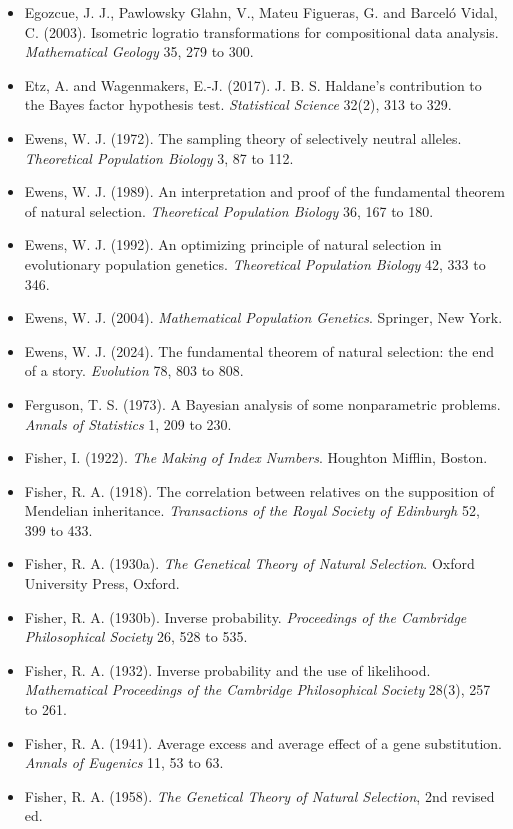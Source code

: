 \begin{itemize}
\item Egozcue, J. J., Pawlowsky Glahn, V., Mateu Figueras, G. and Barcel\'o Vidal, C. (2003).
Isometric logratio transformations for compositional data analysis. \emph{Mathematical Geology} 35,
279 to 300.
\item Etz, A. and Wagenmakers, E.-J. (2017). J. B. S. Haldane's contribution to the Bayes factor
hypothesis test. \emph{Statistical Science} 32(2), 313 to 329.
\item Ewens, W. J. (1972). The sampling theory of selectively neutral alleles.
\emph{Theoretical Population Biology} 3, 87 to 112.
\item Ewens, W. J. (1989). An interpretation and proof of the fundamental theorem of natural
selection. \emph{Theoretical Population Biology} 36, 167 to 180.
\item Ewens, W. J. (1992). An optimizing principle of natural selection in evolutionary population
genetics. \emph{Theoretical Population Biology} 42, 333 to 346.
\item Ewens, W. J. (2004). \emph{Mathematical Population Genetics}. Springer, New York.
\item Ewens, W. J. (2024). The fundamental theorem of natural selection: the end of a story.
\emph{Evolution} 78, 803 to 808.
\item Ferguson, T. S. (1973). A Bayesian analysis of some nonparametric problems.
\emph{Annals of Statistics} 1, 209 to 230.
\item Fisher, I. (1922). \emph{The Making of Index Numbers}. Houghton Mifflin, Boston.
\item Fisher, R. A. (1918). The correlation between relatives on the supposition of Mendelian
inheritance. \emph{Transactions of the Royal Society of Edinburgh} 52, 399 to 433.
\item Fisher, R. A. (1930a). \emph{The Genetical Theory of Natural Selection}. Oxford University
Press, Oxford.
\item Fisher, R. A. (1930b). Inverse probability. \emph{Proceedings of the Cambridge Philosophical
Society} 26, 528 to 535.
\item Fisher, R. A. (1932). Inverse probability and the use of likelihood. \emph{Mathematical
Proceedings of the Cambridge Philosophical Society} 28(3), 257 to 261.
\item Fisher, R. A. (1941). Average excess and average effect of a gene substitution.
\emph{Annals of Eugenics} 11, 53 to 63.
\item Fisher, R. A. (1958). \emph{The Genetical Theory of Natural Selection}, 2nd revised ed.

\end{itemize}
